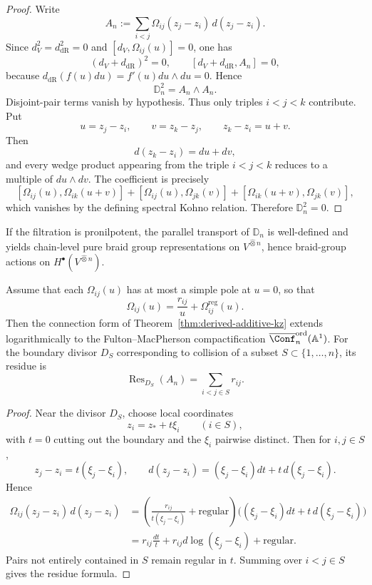 \begin{proof}
Write
\[
A_n:=\sum_{i<j}\Omega_{ij}(z_j-z_i)\,d(z_j-z_i).
\]
Since $d_V^2=d_{\mathrm{dR}}^2=0$ and $[d_V,\Omega_{ij}(u)]=0$, one has
\[
(d_V+d_{\mathrm{dR}})^2=0,
\qquad
[d_V+d_{\mathrm{dR}},A_n]=0,
\]
because $d_{\mathrm{dR}}(f(u)du)=f'(u)du\wedge du=0$.
Hence
\[
\mathbb D_n^2=A_n\wedge A_n.
\]
Disjoint-pair terms vanish by hypothesis.  Thus only triples
$i<j<k$ contribute.  Put
\[
u=z_j-z_i,
\qquad
v=z_k-z_j,
\qquad
z_k-z_i=u+v.
\]
Then
\[
d(z_k-z_i)=du+dv,
\]
and every wedge product appearing from the triple $i<j<k$ reduces to a
multiple of $du\wedge dv$.  The coefficient is precisely
\[
[\Omega_{ij}(u),\Omega_{ik}(u+v)]
+[\Omega_{ij}(u),\Omega_{jk}(v)]
+[\Omega_{ik}(u+v),\Omega_{jk}(v)],
\]
which vanishes by the defining spectral Kohno relation.  Therefore
$\mathbb D_n^2=0$.
\end{proof}

\begin{corollary}
\ClaimStatusProvedHere
If the filtration is pronilpotent, the parallel transport of
$\mathbb D_n$ is well-defined and yields chain-level pure braid group
representations on $V^{\widehat\otimes n}$, hence braid-group actions
on $H^\bullet(V^{\widehat\otimes n})$.
\end{corollary}

\begin{theorem}
\ClaimStatusProvedHere
\label{thm:boundary-residue}
Assume that each $\Omega_{ij}(u)$ has at most a simple pole at $u=0$,
so that
\[
\Omega_{ij}(u)=\frac{r_{ij}}{u}+\Omega_{ij}^{\mathrm{reg}}(u).
\]
Then the connection form of Theorem~\ref{thm:derived-additive-kz}
extends logarithmically to the Fulton--MacPherson compactification
$\overline{\Conf}_n^{\mathrm{ord}}(\mathbb A^1)$.
For the boundary divisor $D_S$ corresponding to collision of a subset
$S\subset\{1,\dots,n\}$, its residue is
\[
\operatorname{Res}_{D_S}(A_n)=\sum_{i<j\in S} r_{ij}.
\]
\end{theorem}

\begin{proof}
Near the divisor $D_S$, choose local coordinates
\[
z_i=z_*+t\xi_i\qquad (i\in S),
\]
with $t=0$ cutting out the boundary and the $\xi_i$ pairwise distinct.
Then for $i,j\in S$,
\[
z_j-z_i=t(\xi_j-\xi_i),
\qquad
 d(z_j-z_i)=(\xi_j-\xi_i)dt+t\,d(\xi_j-\xi_i).
\]
Hence
\begin{align*}
\Omega_{ij}(z_j-z_i)\,d(z_j-z_i)
&=
\left(\frac{r_{ij}}{t(\xi_j-\xi_i)}+\text{regular}\right)
\big((\xi_j-\xi_i)dt+t\,d(\xi_j-\xi_i)\big)\\
&=r_{ij}\frac{dt}{t}+r_{ij}d\log(\xi_j-\xi_i)+\text{regular}.
\end{align*}
Pairs not entirely contained in $S$ remain regular in $t$.
Summing over $i<j\in S$ gives the residue formula.
\end{proof}

